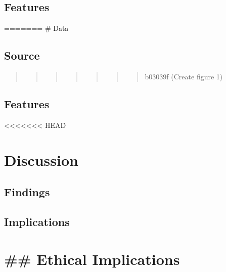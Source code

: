 \documentclass[
]{article}
\begin{document}
\hypertarget{features}{%
\subsection{Features}\label{features}}

======= \# Data

\hypertarget{source-1}{%
\subsection{Source}\label{source-1}}

\begin{quote}
\begin{quote}
\begin{quote}
\begin{quote}
\begin{quote}
\begin{quote}
\begin{quote}
b03039f (Create figure 1)
\end{quote}
\end{quote}
\end{quote}
\end{quote}
\end{quote}
\end{quote}
\end{quote}

\hypertarget{features-1}{%
\subsection{Features}\label{features-1}}

\textless\textless\textless\textless\textless\textless\textless{} HEAD

\hypertarget{discussion}{%
\section{Discussion}\label{discussion}}

\hypertarget{findings}{%
\subsection{Findings}\label{findings}}

\hypertarget{implications}{%
\subsection{Implications}\label{implications}}

\hypertarget{ethical-implications}{%
\section{\#\# Ethical Implications}\label{ethical-implications}}
\end{document}
